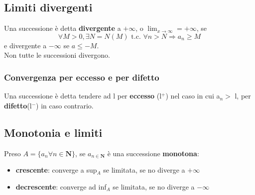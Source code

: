 \documentclass{report}
\begin{document}
    \subsection{Limiti divergenti}
        Una successione è detta \textbf{divergente} a $+\infty$, o 
        $\lim_{x \to \infty} = +\infty$, se $$\forall M > 0, \exists N = N\left(M\right)
        \textrm{ t.c. } \forall n > N \Longrightarrow a_n \geq M$$ e divergente a 
        $-\infty$ se $a \leq -M$. \\
        Non tutte le successioni divergono.
        \subsubsection{Convergenza per eccesso e per difetto}
            Una successione è detta tendere ad l per \textbf{eccesso} (l$^+$) nel caso 
            in cui a$_n >$ l, per \textbf{difetto}(l$^-$) in caso contrario.
    \subsection{Monotonia e limiti}
        Preso $A = \{a_n \forall n \in \mathbf{N}\}$, se $a_{n \in \mathbf{N}}$ è una successione \textbf{monotona}:
        \begin{itemize}
            \item \textbf{crescente}: converge a sup$_A$ se limitata, se no diverge a $+\infty$
            \item \textbf{decrescente}: converge ad inf$_A$ se limitata, se no diverge a $-\infty$
        \end{itemize}
\end{document}

